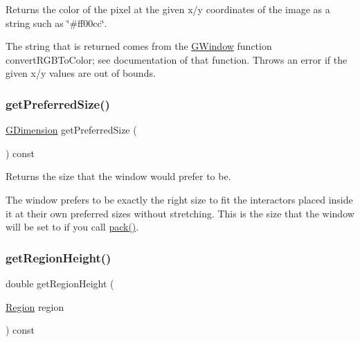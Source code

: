 Returns the color of the pixel at the given x/y coordinates of the image as a string such as \char`\"{}\#ff00cc\char`\"{}. 

The string that is returned comes from the {\ttfamily \mbox{\hyperlink{classGWindow}{G\+Window}}} function {\ttfamily convert\+R\+G\+B\+To\+Color}; see documentation of that function. Throws an error if the given x/y values are out of bounds. \mbox{\label{classGWindow_a4aabbee761d8e9116275401131b7ccd1}} 
\subsubsection{\texorpdfstring{get\+Preferred\+Size()}{getPreferredSize()}}
{\footnotesize\ttfamily \mbox{\hyperlink{structGDimension}{G\+Dimension}} get\+Preferred\+Size (\begin{DoxyParamCaption}{ }\end{DoxyParamCaption}) const\hspace{0.3cm}{\ttfamily [virtual]}}



Returns the size that the window would prefer to be. 

The window prefers to be exactly the right size to fit the interactors placed inside it at their own preferred sizes without stretching. This is the size that the window will be set to if you call \mbox{\hyperlink{classGWindow_a915ffc82b17862ab1d2a466a79d23a3f}{pack()}}. \mbox{\label{classGWindow_a164d248057318961e7f2abc8c3477d63}} 
\subsubsection{\texorpdfstring{get\+Region\+Height()}{getRegionHeight()}\hspace{0.1cm}{\footnotesize\ttfamily [1/2]}}
{\footnotesize\ttfamily double get\+Region\+Height (\begin{DoxyParamCaption}\item[{\mbox{\hyperlink{classGWindow_a81a01a86de31071a92e6cce0bab9bc4b}{Region}}}]{region }\end{DoxyParamCaption}) const\hspace{0.3cm}{\ttfamily [virtual]}}



